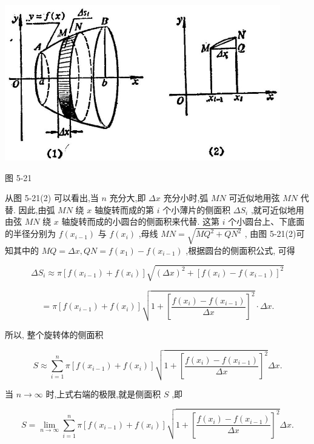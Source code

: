 \documentclass[10pt]{article}
\begin{document}
\begin{center}
\includegraphics[max width=0.9\textwidth]{images/01912c18-5c3f-733d-b775-749ba9897a9d_244_731175.jpg}
\end{center}

图 5-21

从图 5-21(2) 可以看出,当 \(n\) 充分大,即 \({\Delta x}\) 充分小时,弧 \({MN}\) 可近似地用弦 \({MN}\) 代替. 因此,由弧 \({MN}\) 绕 \(x\) 轴旋转而成的第 \(i\) 个小薄片的侧面积 \(\Delta {S}_{i}\) ,就可近似地用由弦 \({MN}\) 绕 \(x\) 轴旋转而成的小圆台的侧面积来代替. 这第 \(i\) 个小圆台上、下底面的半径分别为 \(f\left( {x}_{i - 1}\right)\) 与 \(f\left( {x}_{i}\right)\) ,母线 \({MN} = \sqrt{M{Q}^{2} + Q{N}^{2}}\) , 由图 5-21(2)可知其中的 \({MQ} = {\Delta x},{QN} = f\left( {x}_{1}\right) - f\left( {x}_{i - 1}\right)\) ,根据圆台的侧面积公式, 可得

\[
\Delta {S}_{i} \approx \pi \left\lbrack {f\left( {x}_{i - 1}\right) + f\left( {x}_{i}\right) }\right\rbrack \sqrt{{\left( \Delta x\right) }^{2} + {\left\lbrack f\left( {x}_{i}\right) - f\left( {x}_{i - 1}\right) \right\rbrack }^{2}}
\]

\[
= \pi \left\lbrack {f\left( {x}_{i - 1}\right) + f\left( {x}_{i}\right) }\right\rbrack \sqrt{1 + {\left\lbrack \frac{f\left( {x}_{i}\right) - f\left( {x}_{i - 1}\right) }{\Delta x}\right\rbrack }^{2}} \cdot {\Delta x}.
\]

所以, 整个旋转体的侧面积

\[
S \approx \mathop{\sum }\limits_{{i = 1}}^{n}\pi \left\lbrack {f\left( {x}_{i - 1}\right) + f\left( {x}_{i}\right) }\right\rbrack \sqrt{1 + {\left\lbrack \frac{f\left( {x}_{i}\right) - f\left( {x}_{i - 1}\right) }{\Delta x}\right\rbrack }^{2}}{\Delta x}.
\]

当 \(n \rightarrow \infty\) 时,上式右端的极限,就是侧面积 \(S\) ,即

\[
S = \mathop{\lim }\limits_{{n \rightarrow \infty }}\mathop{\sum }\limits_{{i = 1}}^{n}\pi \left\lbrack {f\left( {x}_{i - 1}\right) + f\left( {x}_{i}\right) }\right\rbrack \sqrt{1 + {\left\lbrack \frac{f\left( {x}_{i}\right) - f\left( {x}_{i - 1}\right) }{\Delta x}\right\rbrack }^{2}}{\Delta x}.
\]
\end{document}
